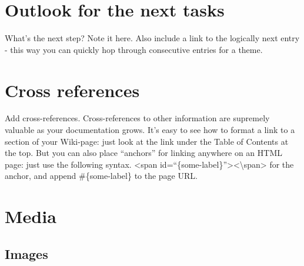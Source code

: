 \documentclass[]{book}
\begin{document}
\section{Outlook for the next tasks}\label{outlook-for-the-next-tasks}

What's the next step? Note it here. Also include a link to the logically
next entry - this way you can quickly hop through consecutive entries
for a theme.

\section{Cross references}\label{cross-references}

Add cross-references. Cross-references to other information are
supremely valuable as your documentation grows. It's easy to see how to
format a link to a section of your Wiki-page: just look at the link
under the Table of Contents at the top. But you can also place
``anchors'' for linking anywhere on an HTML page: just use the following
syntax. \textless{}span
id=``\{some-label\}''\textgreater{}\textless{}\textbackslash{}span\textgreater{}
for the anchor, and append \#\{some-label\} to the page URL.

\section{Media}\label{media}

\subsection{Images}\label{images}
\end{document}
